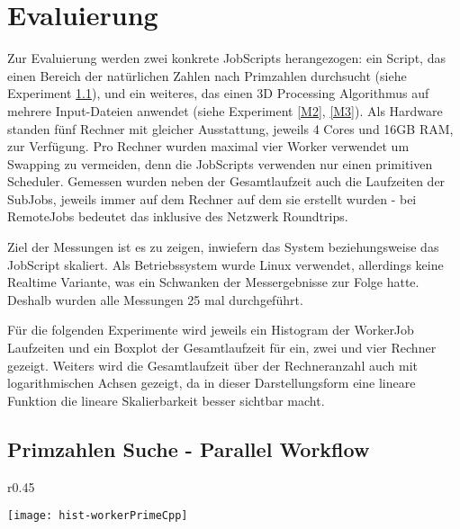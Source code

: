 
\chapter{Evaluierung}
\label{K7}
Zur Evaluierung werden zwei konkrete JobScripts herangezogen: ein Script, das einen Bereich der natürlichen Zahlen nach Primzahlen durchsucht (siehe Experiment \ref{M1}), und ein weiteres, das einen 3D Processing Algorithmus auf mehrere Input-Dateien anwendet (siehe Experiment \ref{M2}, \ref{M3}).
Als Hardware standen fünf Rechner mit gleicher Ausstattung, jeweils 4 Cores und 16GB RAM, zur Verfügung. Pro Rechner wurden maximal vier Worker verwendet um Swapping zu vermeiden, denn die JobScripts verwenden nur einen primitiven Scheduler.
Gemessen wurden neben der Gesamtlaufzeit auch die Laufzeiten der SubJobs, jeweils immer auf dem Rechner auf dem sie erstellt wurden - bei RemoteJobs bedeutet das inklusive des Netzwerk Roundtrips.

Ziel der Messungen ist es zu zeigen, inwiefern das System beziehungsweise das JobScript skaliert. Als Betriebssystem wurde Linux verwendet, allerdings keine Realtime Variante, was ein Schwanken der Messergebnisse zur Folge hatte. Deshalb wurden alle Messungen 25 mal durchgeführt.

Für die folgenden Experimente wird jeweils ein Histogram der WorkerJob Laufzeiten und ein Boxplot der Gesamtlaufzeit für ein, zwei und vier Rechner gezeigt. Weiters wird die Gesamtlaufzeit über der Rechneranzahl auch mit logarithmischen Achsen gezeigt, da in dieser Darstellungsform eine lineare Funktion die lineare Skalierbarkeit besser sichtbar macht.





\clearpage
\section{Primzahlen Suche - Parallel Workflow}
\label{M1}

\begin{wrapfigure}{r}{0.45\textwidth}
  \vspace{-30pt}
  \begin{center}
    \texttt{[image: hist-workerPrimeCpp]}
    \caption{Experiment \ref{M1} WorkerJob Laufzeiten aller 25 Iterationen in 50bins.}
    \label{hist-workerPrimeCpp}
  \end{center}
\end{wrapfigure}

